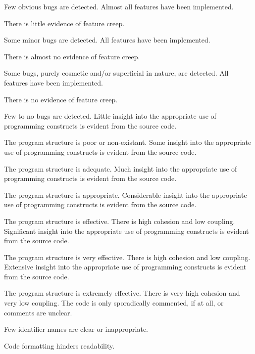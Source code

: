 \begin{markingrubric}
            \par Few obvious bugs  are detected.
        \grade Almost all features have been implemented.
            \par There is little evidence of feature creep.
            \par Some minor bugs  are detected.
        \grade All features have been implemented.
            \par There is almost no evidence of feature creep.
            \par Some bugs, purely cosmetic and/or superficial in nature, are detected.
        \grade All features have been implemented.
            \par There is no evidence of feature creep.
            \par Few to no bugs are detected.
%
        \grade \fail Little insight into the appropriate use of programming constructs is evident from the source code.
            \par The program structure is poor or non-existant.
        \grade Some insight into the appropriate use of programming constructs is evident from the source code.
            \par The program structure is adequate.
        \grade Much insight into the appropriate use of programming constructs is evident from the source code.
            \par The program structure is appropriate.
        \grade Considerable insight into the appropriate use of programming constructs is evident from the source code.
            \par The program structure is effective. There is high cohesion and low coupling.
        \grade Significant insight into the appropriate use of programming constructs is evident from the source code.
            \par The program structure is very effective. There is high cohesion and low coupling.
        \grade Extensive insight into the appropriate use of programming constructs is evident from the source code.
            \par The program structure is extremely effective. There is very high cohesion and very low coupling.
%
        \grade \fail The code is only sporadically commented, if at all, or comments are unclear.
            \par Few identifier names are clear or inappropriate.
            \par Code formatting hinders readability.

\end{markingrubric}
